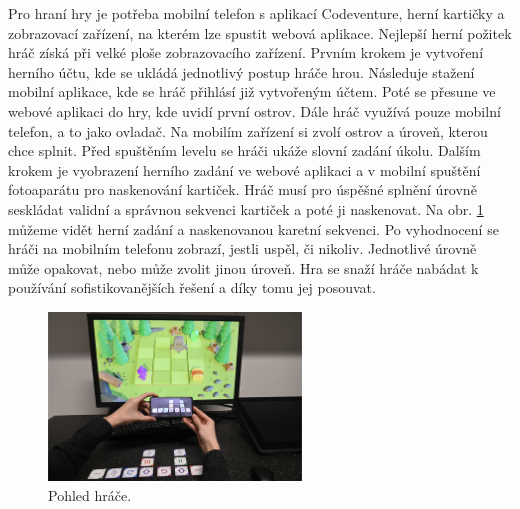 Pro hraní hry je potřeba mobilní telefon s aplikací Codeventure, herní kartičky a zobrazovací zařízení, na kterém lze spustit webová aplikace. Nejlepší herní požitek hráč získá při velké ploše zobrazovacího zařízení. Prvním krokem je vytvoření herního účtu, kde se ukládá jednotlivý postup hráče hrou. Následuje stažení mobilní aplikace, kde se hráč přihlásí již vytvořeným účtem. Poté se přesune ve webové aplikaci do hry, kde uvidí první ostrov. Dále hráč využívá pouze mobilní telefon, a to jako ovladač. Na mobilím zařízení si zvolí ostrov a úroveň, kterou chce splnit. Před spuštěním levelu se hráči ukáže slovní zadání úkolu. Dalším krokem je vyobrazení herního zadání ve webové aplikaci a v mobilní spuštění fotoaparátu pro naskenování kartiček. Hráč musí pro úspěšné splnění úrovně seskládat validní a správnou sekvenci kartiček a poté ji naskenovat. Na obr. \ref{fig:pohled-hrace} můžeme vidět herní zadání a naskenovanou karetní sekvenci. Po vyhodnocení se hráči na mobilním telefonu zobrazí, jestli uspěl, či nikoliv. Jednotlivé úrovně může opakovat, nebo může zvolit jinou úroveň. Hra se snaží hráče nabádat k používání sofistikovanějších řešení a díky tomu jej posouvat. 

\begin{figure}[h]
    \centering
    \includegraphics[width=0.6\textwidth]{img/pohled-hrace.png}
    \caption{Pohled hráče.}
    \label{fig:pohled-hrace}
\end{figure}
